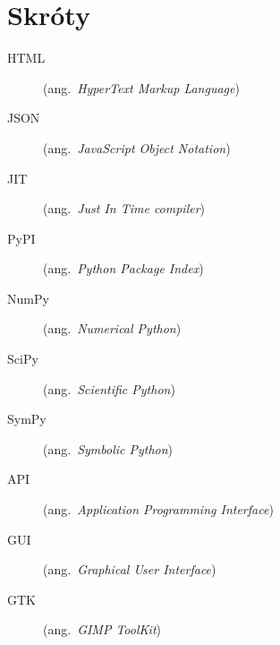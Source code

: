 \chapter*{Skróty}\mbox{}
\label{sec:skroty}
\noindent
\begin{description}
  \item [HTML]    (ang.\ \emph{HyperText Markup Language})
  \item [JSON]    (ang.\ \emph{JavaScript Object Notation})
  \item [JIT]     (ang.\ \emph{Just In Time compiler})
  \item [PyPI]    (ang.\ \emph{Python Package Index})
  \item [NumPy]   (ang.\ \emph{Numerical Python})
  \item [SciPy]   (ang.\ \emph{Scientific Python})
  \item [SymPy]   (ang.\ \emph{Symbolic Python})
  \item [API]     (ang.\ \emph{Application Programming Interface})
  \item [GUI]     (ang.\ \emph{Graphical User Interface})
  \item [GTK]     (ang.\ \emph{GIMP ToolKit})
\end{description}
